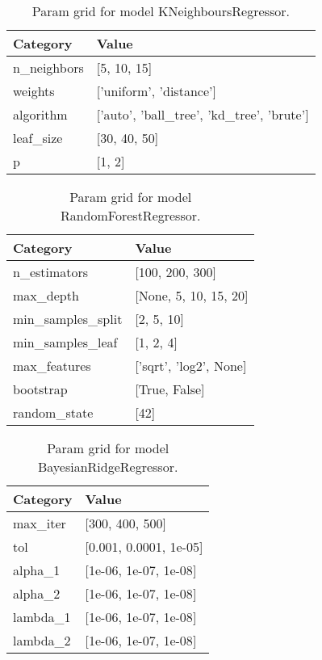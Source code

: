\documentclass{article}%
\begin{document}
%


\begin{table}[H]%
\begin{center}%
\renewcommand{\arraystretch}{1.5}%
\begin{tabular}{l l}%
\hline%
\textbf{Category}&\textbf{Value}\\%
\hline%
n\_neighbors&{[}5, 10, 15{]}\\%
weights&{[}'uniform', 'distance'{]}\\%
algorithm&{[}'auto', 'ball\_tree', 'kd\_tree', 'brute'{]}\\%
leaf\_size&{[}30, 40, 50{]}\\%
p&{[}1, 2{]}\\%
\hline%
\end{tabular}%
\end{center}%
\caption{Param grid for model KNeighboursRegressor.}%
\end{table}

%


\begin{table}[H]%
\begin{center}%
\renewcommand{\arraystretch}{1.5}%
\begin{tabular}{l l}%
\hline%
\textbf{Category}&\textbf{Value}\\%
\hline%
n\_estimators&{[}100, 200, 300{]}\\%
max\_depth&{[}None, 5, 10, 15, 20{]}\\%
min\_samples\_split&{[}2, 5, 10{]}\\%
min\_samples\_leaf&{[}1, 2, 4{]}\\%
max\_features&{[}'sqrt', 'log2', None{]}\\%
bootstrap&{[}True, False{]}\\%
random\_state&{[}42{]}\\%
\hline%
\end{tabular}%
\end{center}%
\caption{Param grid for model RandomForestRegressor.}%
\end{table}

%


\begin{table}[H]%
\begin{center}%
\renewcommand{\arraystretch}{1.5}%
\begin{tabular}{l l}%
\hline%
\textbf{Category}&\textbf{Value}\\%
\hline%
max\_iter&{[}300, 400, 500{]}\\%
tol&{[}0.001, 0.0001, 1e{-}05{]}\\%
alpha\_1&{[}1e{-}06, 1e{-}07, 1e{-}08{]}\\%
alpha\_2&{[}1e{-}06, 1e{-}07, 1e{-}08{]}\\%
lambda\_1&{[}1e{-}06, 1e{-}07, 1e{-}08{]}\\%
lambda\_2&{[}1e{-}06, 1e{-}07, 1e{-}08{]}\\%
\hline%
\end{tabular}%
\end{center}%
\caption{Param grid for model BayesianRidgeRegressor.}%
\end{table}
\end{document}
